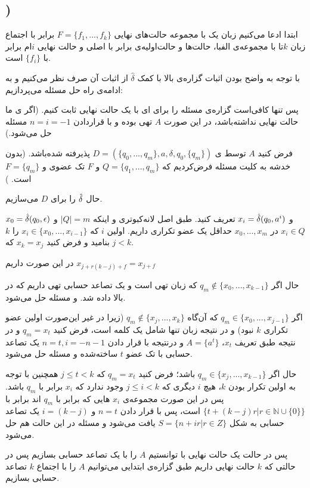 \documentclass[12pt]{article}
\newcounter{problemcounter}
\newcounter{subproblemcounter}
\newcommand{\subproblem}{
\subsection*{\alph{subproblemcounter})}\stepcounter{subproblemcounter}
}
\begin{document}
\subproblem{}
ابتدا ادعا می‌کنیم زبان یک \dfa با مجموعه حالت‌های نهایی 
$F = \{f_1, ..., f_k\}$
برابر با اجتماع زبان $k$تا \dfa با مجموعه‌ی الفبا، حالت‌ها و حالت‌اولیه‌ی برابر با \dfa اصلی و حالت نهایی $i$ام برابر با $\{f_i\}$ است.

با توجه به واضح بودن اثبات گزاره‌ی بالا با کمک $\hat{\delta}$ از اثبات آن صرف نظر می‌کنیم و به ادامه‌ی راه حل مسئله می‌پردازیم:

پس تنها کافی‌است گزاره‌ی مسئله را برای \dfa ای با یک حالت نهایی ثابت کنیم. (اگر \dfa ی ما حالت نهایی نداشته‌باشد، در این صورت $A$ تهی بوده و با قراردادن $n = i = -1$ مسئله حل می‌شود.)

فرض کنید $A$ توسط \dfa ی 
$D = (\{q_0,...,q_m\}, {a}, \delta, q_0, \{q_m\})$
پذیرفته شده‌باشد. (بدون خدشه به کلیت مسئله فرض‌کردیم که $Q = \{q_1, ..., q_m\}$ و $F$ تک عضوی و  $F = \{q_m\}$ است. )

حال $\hat{\delta}$ را برای $D$ می‌سازیم. 


$x_0 = \hat{\delta}(q_0, \epsilon)$
و
$x_i = \hat{\delta}(q_0, a^i)$ 
تعریف کنید. 
طبق اصل لانه‌کبوتری و اینکه $|Q| = m$ و $x_i \in Q$ 
در 
$x_0, ..., x_m$
حداقل یک عضو تکراری داریم. اولین $i$ که $x_i \in \{x_0, ..., x_{i-1}\}$ را $k$ بنامید و فرض کنید $x_k = x_j$ که $j < k$.

در این صورت داریم 
$x_{j + r (k-j) + f} = x_{j + f}$

حال اگر 
$q_m \notin \{x_0, ..., x_{k-1}\}$
 که زبان تهی است و یک تصاعد حسابی تهی داریم که در بالا داده شد. و مسئله حل می‌شود.

اگر 
$q_m \in \{x_0, ..., x_{j-1}\}$
که آن‌گاه 
$q_m \notin \{x_{j}, ..., x_k\}$
(زیرا در غیر این‌صورت اولین عضو تکراری $k$ نبود) و در نتیجه زبان تنها شامل یک کلمه است، فرض کنید $q_m = x_t$ و در نتیجه طبق تعریف $x_t$،
$A = \{ a^t\}$
و درنتیجه با قرار دادن $n = t, i = -n-1$ یک تصاعد حسابی با تک عضو $t$ ساخته‌شده و مسئله حل می‌شود.

حال اگر 
$q_m \in \{x_{j}, ..., x_{k-1}\}$
باشد؛ فرض کنید $q_m = x_t$ که $j \leq t < k$ همچنین با توجه به اولین تکرار بودن $k$، هیچ $i$ دیگری که $j \leq i < k$ وجود ندارد که $x_i$ برابر با $q_m$ باشد. پس در این صورت مجموعه‌ی $x_i$ هایی که برابر با $q_m$ اند برابر با
$\{t + (k-j)r| r \in \mathbb{N}\cup\{0\} \}$
است، پس با قرار دادن $n = t$ و $i= (k-j)$ یک تصاعد حسابی به شکل 
$S = \{n + ir | r \in Z \}$
یافت می‌شود و مسئله در این حالت هم حل می‌شود.

پس در حالت یک حالت نهایی با توانستیم $A$ را با یک تصاعد حسابی بسازیم پس در حالتی که $k$ حالت نهایی داریم طبق گزاره‌ی ابتدایی می‌توانیم $A$ را با اجتماع $k$ تصاعد حسابی بسازیم.
\end{document}
